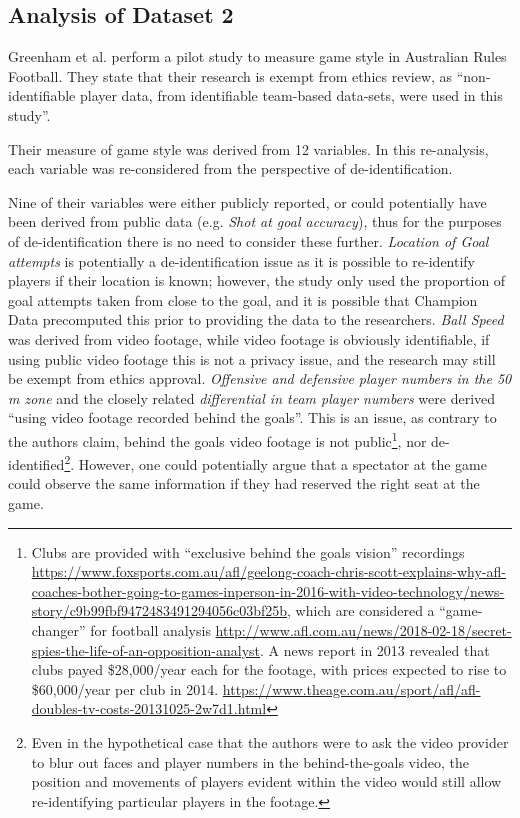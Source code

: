 \subsection{Analysis of Dataset 2}

Greenham et al. \cite{Greenham2017} perform a pilot study to measure game style in Australian Rules Football. They state that their research is exempt from ethics review, as ``non-identifiable player data, from identifiable team-based data-sets, were used in this study''.

Their measure of game style was derived from 12 variables. In this re-analysis, each variable was re-considered from the perspective of de-identification.

Nine of their variables were either publicly reported, or could potentially have been derived from public data (e.g. \textit{Shot at goal accuracy}), thus for the purposes of de-identification there is no need to consider these further. \textit{Location of Goal attempts} is potentially a de-identification issue as it is possible to re-identify players if their location is known; however, the study only used the proportion of goal attempts taken from close to the goal, and it is possible that Champion Data precomputed this prior to providing the data to the researchers. \textit{Ball Speed} was derived from video footage, while video footage is obviously identifiable, if using public video footage this is not a privacy issue, and the research may still be exempt from ethics approval. \textit{Offensive and defensive player numbers in the 50 m zone} and the closely related \textit{differential in team player numbers} were derived ``using video footage recorded behind the goals''. This is an issue, as contrary to the authors claim, behind the goals video footage is not public\footnote{Clubs are provided with ``exclusive behind the goals vision'' recordings \url{https://www.foxsports.com.au/afl/geelong-coach-chris-scott-explains-why-afl-coaches-bother-going-to-games-inperson-in-2016-with-video-technology/news-story/c9b99fbf9472483491294056c03bf25b}, which are considered a ``game-changer'' for football analysis \url{http://www.afl.com.au/news/2018-02-18/secret-spies-the-life-of-an-opposition-analyst}. A news report in 2013 revealed that clubs payed \$28,000/year each for the footage, with prices expected to rise to \$60,000/year per club in 2014. \url{https://www.theage.com.au/sport/afl/afl-doubles-tv-costs-20131025-2w7d1.html}}, nor de-identified\footnote{Even in the hypothetical case that the authors were to ask the video provider to blur out faces and player numbers in the behind-the-goals video, the position and movements of players evident within the video would still allow re-identifying particular players in the footage.}. However, one could potentially argue that a spectator at the game could observe the same information if they had reserved the right seat at the game.

